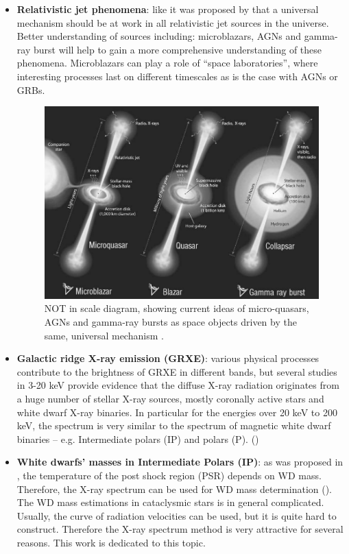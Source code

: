 \documentclass[oneside,a4paper,11pt]{report}
\begin{document}
\begin{itemize}
 \item \textbf{Relativistic jet phenomena}: like it was proposed by \citet{mirabel:1} that a universal 
mechanism should be at work in all relativistic jet sources in the universe. Better understanding 
of sources including: microblazars, AGNs and gamma-ray burst will help to gain a more comprehensive 
understanding of these phenomena. Microblazars can play a role of “space laboratories”, where interesting
 processes last on different timescales as is the case with AGNs or GRBs.   

\begin{figure}[!hbt]
\centering
\includegraphics[totalheight=8.5cm]{microblazars}
\caption{NOT in scale diagram, showing current ideas of micro-quasars, AGNs and gamma-ray
bursts as space objects driven by the same, universal mechanism  \citet{mirabel:1}. }
\label{microblazar} 
\end{figure}

 \item \textbf{Galactic ridge X-ray emission (GRXE)}: various physical processes contribute to the
brightness of GRXE in different bands, but several studies in 3-20 keV provide evidence that the diffuse 
X-ray radiation originates from a huge number of stellar X-ray sources, mostly coronally active stars
 and white dwarf X-ray binaries. In particular for the energies over 20 keV to 200 keV, the spectrum is
very similar to the spectrum of magnetic white dwarf binaries – e.g. Intermediate polars (IP) and polars (P).  
(\citet{2007A&A...463..957K})
 
 \item \textbf{White dwarfs' masses in Intermediate Polars (IP)}: as was proposed in \citet{1981ApJ...250..723R}, 
the temperature of the post shock region (PSR) depends on WD mass. Therefore, the X-ray spectrum can be 
used for WD mass determination (\citet{2005A&A...435..191S}). The WD mass estimations in cataclysmic stars 
is in general complicated. Usually, the curve of radiation velocities can be used, but it is quite hard to construct. 
Therefore the X-ray spectrum method is very attractive for several reasons. This work is dedicated to this topic.  

\end{itemize}
\end{document}

